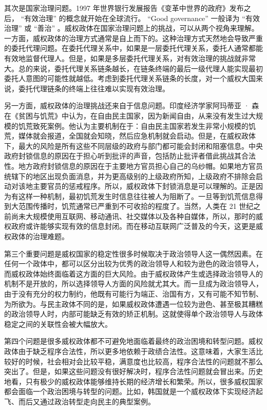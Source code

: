其次是国家治理问题。1997 年世界银行发展报告《变革中世界的政府》发布之后， “有效治理” 的概念就开始在全球流行。 “Good governance” 一般译为 “有效治理” 或 “善治” 。威权政体在国家治理问题上的挑战，可以从两个视角来理解。一方面，威权政体的治理方式通常是自上而下的。这种治理方式天然地会导致严重的委托代理问题。在委托代理关系中，如果是一层委托代理关系，委托人通常都能有效地监督代理人。但是，如果是多层委托代理关系，对有效治理的挑战就非常大。总的来说，委托代理关系链条越长，在链条终端的最后一级代理人能实现最初委托人意图的可能性就越低。考虑到委托代理关系链条的长度，对一个威权大国来说，委托代理链条的终端上往往难以实现有效治理。

另一方面，威权政体的治理挑战还来自于信息问题。印度经济学家阿玛蒂亚 · 森在《贫困与饥荒》中认为，在自由民主国家，因为新闻自由，从来没有发生过大规模的饥荒致死案例。他认为主要机制在于：自由民主国家若发生非常小规模的饥荒，媒体就会报道，全国就会知晓，然后应急机制就会启动。但是，在威权政体下，最大的风险是所有这些不同层级的政府与部门都可能会封闭和阻塞信息。中央政府封锁信息的原因在于担心听到批评的声音，包括防止批评者借此挑战其合法性。地方政府封锁信息的原因在于主要地方官员担心自己的乌纱帽。如果地方官员统辖下的地区出现负面消息，并为更高级别的上级政府所知，上级政府不排除会启动对该地主要官员的惩戒程序。所以，威权政体下封锁消息是可以理解的。正是因为有这样一种机制，最初饥荒发生时信息往往被人为阻断了。一旦等到饥荒信息得到大范围传播时，饥荒通常已严重到不可收拾的程度了。当然，人类在 21 世纪之前尚未大规模使用互联网、移动通讯、社交媒体以及各种自媒体，所以，那时的威权政府或许能够实现有效的信息封闭。而在移动互联网广泛普及的今天，这更是威权政体的治理难题。

第三个重要问题是威权国家的稳定性很多时候取决于政治领导人这一偶然因素。在任何一个政体中，都可以区分出较为优秀的政治领导人和较为逊色的政治领导人，而威权政体始终面临着这方面的巨大风险。由于威权政体产生或选择政治领导人的机制不是开放的，所以选择领导人方面的风险就尤其大。而一旦成为政治领导人，由于没有充分的权力制约，他既有可能行为端正、治国有方，又有可能不知节制、为所欲为。与民主政体不同的是，如果威权政体遭遇一位较为逊色、甚至极其糟糕的政治领导人时，内部可能缺乏有效的矫正机制。这就使得单个政治领导人与政体稳定之间的关联性会被大幅放大。

第四个问题是很多威权政体都不可避免地面临着最终的政治困境和转型问题。威权政体由于缺乏程序合法性，所以更多地依赖于政绩合法性。这意味着，大家生活比较好的时候，社会相对会比较平稳，满意度也比较高，程序合法性的问题就不那么突出了。但是，如果这些问题没有很好解决时，程序合法性问题就会冒出来。历史地看，只有极少的威权政体能够维持长期的经济增长和繁荣。所以，很多威权国家都会面临一个政治困境与转型的问题。比如，韩国就是一个威权政体下实现经济起飞、而后又通过政治转型走向民主的典型案例。

